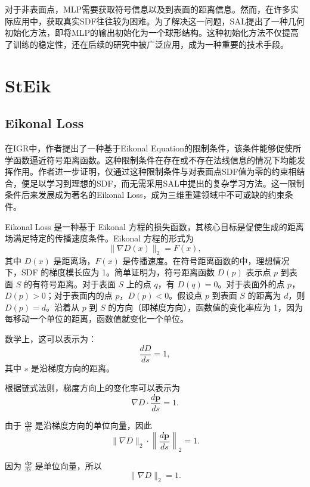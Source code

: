 \documentclass{xduugthesis}
\begin{document}
对于非表面点，MLP需要获取符号信息以及到表面的距离信息。然而，在许多实际应用中，获取真实SDF往往较为困难。为了解决这一问题，SAL提出了一种几何初始化方法，即将MLP的输出初始化为一个球形结构。这种初始化方法不仅提高了训练的稳定性，还在后续的研究中被广泛应用，成为一种重要的技术手段。
\section{StEik}
\subsection{Eikonal Loss}
在IGR中，作者提出了一种基于Eikonal Equation的限制条件，该条件能够促使所学函数逼近符号距离函数。这种限制条件在存在或不存在法线信息的情况下均能发挥作用。作者进一步证明，仅通过这种限制条件与对表面点SDF值为零的约束相结合，便足以学习到理想的SDF，而无需采用SAL中提出的复杂学习方法。这一限制条件后来发展成为著名的Eikonal Loss，成为三维重建领域中不可或缺的约束条件。

Eikonal Loss 是一种基于 Eikonal 方程的损失函数，其核心目标是促使生成的距离场满足特定的传播速度条件。Eikonal 方程的形式为
\begin{equation}
\|\nabla D(x)\|_2 = F(x),
\end{equation}
其中 \( D(x) \) 是距离场，\( F(x) \) 是传播速度。在符号距离函数的中，理想情况下，SDF 的梯度模长应为 1。简单证明为，符号距离函数 \( D(p) \) 表示点 \( p \) 到表面 \( S \) 的有符号距离。对于表面 \( S \) 上的点 \( q \)，有 \( D(q) = 0 \)。对于表面外的点 \( p \)，\( D(p) > 0 \)；对于表面内的点 \( p \)，\( D(p) < 0 \)。假设点 \( p \) 到表面 \( S \) 的距离为 \( d \)，则 \( D(p) = d \)。沿着从 \( p \) 到 \( S \) 的方向（即梯度方向），函数值的变化率应为 1，因为每移动一个单位的距离，函数值就变化一个单位。
    
数学上，这可以表示为：
\begin{equation}
\frac{dD}{ds} = 1,
\end{equation}
其中 \( s \) 是沿梯度方向的距离。

根据链式法则，梯度方向上的变化率可以表示为
\begin{equation}
\nabla D \cdot \frac{d\mathbf{p}}{ds} = 1.
\end{equation}

由于 \( \frac{d\mathbf{p}}{ds} \) 是沿梯度方向的单位向量，因此
\begin{equation}
\|\nabla D\|_2 \cdot \left\| \frac{d\mathbf{p}}{ds} \right\|_2 = 1.
\end{equation}

因为 \( \frac{d\mathbf{p}}{ds} \) 是单位向量，所以
\begin{equation}
\|\nabla D\|_2 = 1.
\end{equation}
\end{document}
